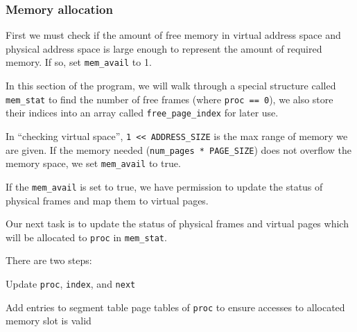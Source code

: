 \documentclass[a4paper]{article}
\numberwithin{equation}{section}
\begin{document}
\subsubsection{Memory allocation}
First we must check if the amount of free memory in virtual address space and physical address space is large enough to represent the amount of required memory.
If so, set \texttt{mem_avail} to 1.

In this section of the program, we will walk through a special structure called \texttt{mem_stat} to find the number of free frames (where \texttt{proc == 0}), we also store their indices into an array called \texttt{free_page_index} for later use.

In ``checking virtual space'', \texttt{1 << ADDRESS_SIZE} is the max range of memory we are given.
If the memory needed (\texttt{num_pages * PAGE_SIZE}) does not overflow the memory space, we set \texttt{mem_avail} to true.

If the \texttt{mem_avail} is set to true, we have permission to update the status of physical frames and map them to virtual pages.

Our next task is to update the status of physical frames and virtual pages which will be allocated to \texttt{proc} in \texttt{mem_stat}.

There are two steps:
\begin{steps}
  \item Update \texttt{proc}, \texttt{index}, and \texttt{next}
  \item Add entries to segment table page tables of \texttt{proc} to ensure accesses to allocated memory slot is valid
\end{steps}
\end{document}
